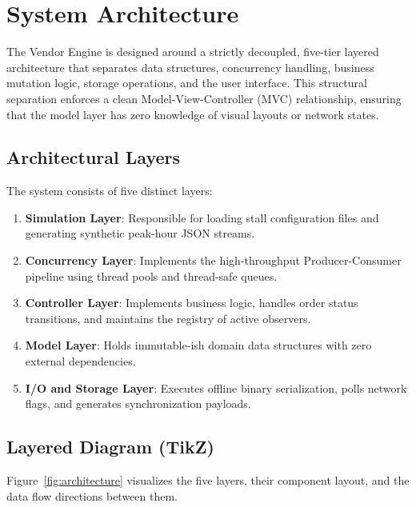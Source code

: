 
\section{System Architecture}
\label{sec:system_architecture}

The Vendor Engine is designed around a strictly decoupled, five-tier layered architecture that separates data structures, concurrency handling, business mutation logic, storage operations, and the user interface. This structural separation enforces a clean Model-View-Controller (MVC) relationship, ensuring that the model layer has zero knowledge of visual layouts or network states.

\subsection{Architectural Layers}
The system consists of five distinct layers:
\begin{enumerate}
    \item \textbf{Simulation Layer}: Responsible for loading stall configuration files and generating synthetic peak-hour JSON streams.
    \item \textbf{Concurrency Layer}: Implements the high-throughput Producer-Consumer pipeline using thread pools and thread-safe queues.
    \item \textbf{Controller Layer}: Implements business logic, handles order status transitions, and maintains the registry of active observers.
    \item \textbf{Model Layer}: Holds immutable-ish domain data structures with zero external dependencies.
    \item \textbf{I/O and Storage Layer}: Executes offline binary serialization, polls network flags, and generates synchronization payloads.
\end{enumerate}

\subsection{Layered Diagram (TikZ)}
Figure~\ref{fig:architecture} visualizes the five layers, their component layout, and the data flow directions between them.

